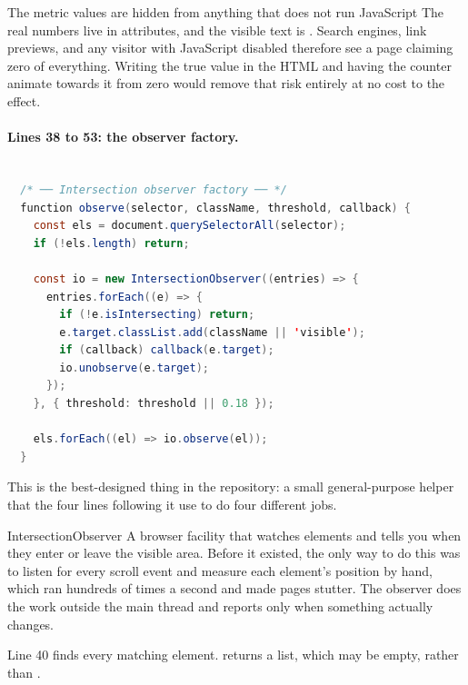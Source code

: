 \begin{honest}{The metric values are hidden from anything that does not run
JavaScript}
The real numbers live in  attributes, and the visible text is
. Search engines, link previews, and any visitor with JavaScript disabled
therefore see a page claiming zero of everything. Writing the true value in the
HTML and having the counter animate towards it from zero would remove that risk
entirely at no cost to the effect.
\end{honest}

\paragraph{Lines 38 to 53: the observer factory.}

\begin{lstlisting}[language=Java,firstnumber=37,caption={\file{js/main.js}, lines 37--53}]

  /* ── Intersection observer factory ── */
  function observe(selector, className, threshold, callback) {
    const els = document.querySelectorAll(selector);
    if (!els.length) return;

    const io = new IntersectionObserver((entries) => {
      entries.forEach((e) => {
        if (!e.isIntersecting) return;
        e.target.classList.add(className || 'visible');
        if (callback) callback(e.target);
        io.unobserve(e.target);
      });
    }, { threshold: threshold || 0.18 });

    els.forEach((el) => io.observe(el));
  }
\end{lstlisting}

This is the best-designed thing in the repository: a small general-purpose helper
that the four lines following it use to do four different jobs.

\begin{jargon}{IntersectionObserver}
A browser facility that watches elements and tells you when they enter or leave
the visible area. Before it existed, the only way to do this was to listen for
every scroll event and measure each element's position by hand, which ran hundreds
of times a second and made pages stutter. The observer does the work outside the
main thread and reports only when something actually changes.
\end{jargon}

Line 40 finds every matching element.  returns a list, which
may be empty, rather than .

